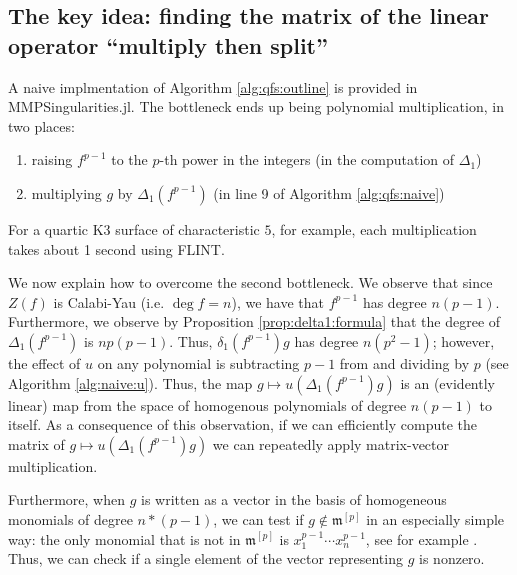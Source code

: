 \subsection{The key idea: finding the matrix of the linear operator ``multiply then split''}

A naive implmentation of Algorithm \ref{alg:qfs:outline}
is provided in MMPSingularities.jl.
The bottleneck ends up being polynomial multiplication, 
in two places:
\begin{enumerate}[(1)]
    \item raising \(f^{p-1}\) to the \(p\)-th power in the integers
        (in the computation of \(\Delta_{1}\))
    \item multiplying \(g\) by \(\Delta_{1}(f^{p-1})\) 
        (in line 9 of Algorithm \ref{alg:qfs:naive})
\end{enumerate}

For a quartic K3 surface of characteristic \(5\),
for example, each multiplication takes about 1 second 
using FLINT. 

%

We now explain how to overcome the second
bottleneck. We observe that 
since \(Z(f)\) is Calabi-Yau
(i.e. \(\deg f = n\)), we have that \(f^{p-1}\) has degree
\(n(p-1)\). 
Furthermore, we observe by Proposition \ref{prop:delta1:formula}
that the degree of \(\Delta_{1}(f^{p-1})\) 
is \(np(p - 1)\).
Thus, \(\delta_{1}(f^{p-1})g\) has degree
\(n(p^{2} - 1)\); however, the effect 
of \(u\) on any polynomial is subtracting \(p-1\)
from and dividing by \(p\) 
(see Algorithm \ref{alg:naive:u}).
Thus, the map 
\(g \mapsto u(\Delta_{1}(f^{p-1}) g)\) 
is an (evidently linear) map from 
the space of homogenous polynomials of degree \(n(p-1)\) 
to itself.
As a consequence of this observation,
if we can efficiently compute the matrix of 
\(g \mapsto u(\Delta_{1}(f^{p-1})g)\)
we can repeatedly apply matrix-vector multiplication.

Furthermore, when \(g\) is written as a vector 
in the basis of homogeneous monomials of degree
\(n*(p-1)\), we can test if \(g \notin \mathfrak{m}^{[p]}\) 
in an especially simple way: the only 
monomial that is not in \(\mathfrak{m}^{[p]}\) is
\(x_{1}^{p-1}\cdots x_{n}^{p-1}\), 
see for example \cite{kty-2022-fedder}.
Thus, we can check if a single element of the vector representing
\(g\) is nonzero.

